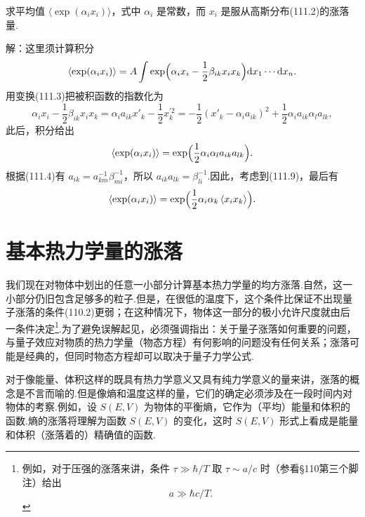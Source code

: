 \begin{xiti}

求平均值 $\langle\exp(\alpha_{i}x_{i})\rangle$，式中 $\alpha_{i}$ 是常数，而 $x_{i}$
是服从高斯分布(111.2)的涨落量.

解：这里须计算积分
\begin{equation*}
  \left\langle\exp(\alpha_{i}x_{i})\right\rangle=A\int
  \exp\Bigl(\alpha_{i}x_{i}-\frac{1}{2}\beta_{ik}x_{i}x_{k}\Bigr)
  \mathrm{d}x_{1}\cdots\mathrm{d}x_{n}.
\end{equation*}
用变换(111.3)把被积函数的指数化为
\begin{equation*}
  \alpha_{i}x_{i}-\frac{1}{2}\beta_{ik}x_{i}x_{k}
  =\alpha_{i}a_{ik}x'_{k}-\frac{1}{2}x_{k}^{\prime 2}
  =-\frac{1}{2}(x'_{k}-\alpha_{i}a_{ik})^{2}
  +\frac{1}{2}\alpha_{i}a_{ik}\alpha_{l}a_{lk},
\end{equation*}
此后，积分给出
\begin{equation*}
  \left\langle\exp(\alpha_{i}x_{i})\right\rangle
  =\exp\Bigl(\frac{1}{2}\alpha_{i}\alpha_{l}a_{ik}a_{lk}\Bigr).
\end{equation*}
根据(111.4)有 $a_{ik}=a^{-1}_{km}\beta^{-1}_{mi}$，所以
$a_{ik}a_{lk}=\beta^{-1}_{li}$.因此，考虑到(111.9)，最后有
\begin{equation*}
  \left\langle\exp(\alpha_{i}x_{i})\right\rangle
  =\exp\Bigl(\frac{1}{2}\alpha_{i}\alpha_{k}
  \left\langle x_{i}x_{k}\right\rangle\Bigr).
\end{equation*}

\end{xiti}

\section{基本热力学量的涨落}

我们现在对物体中划出的任意一小部分计算基本热力学量的均方涨落.自然，这一小部分仍旧包含足够多的粒子.但是，在很低的温度下，这个条件比保证不出现量子涨落的条件(110.2)更弱；在这种情况下，物体这一部分的极小允许尺度就由后一条件决定\footnote{例如，对于压强的涨落来讲，条件 $\tau\gg\hbar/T$ 取 $\tau\sim a/c$ 时（参看§110第三个脚注）给出
\begin{equation*}
  a\gg\hbar c/T.
\end{equation*}}.为了避免误解起见，必须强调指出：关于量子涨落如何重要的问题，与量子效应对物质的热力学量（物态方程）有何影响的问题没有任何关系；涨落可能是经典的，但同时物态方程却可以取决于量子力学公式.

对于像能量、体积这样的既具有热力学意义又具有纯力学意义的量来讲，涨落的概念是不言而喻的.但是像熵和温度这样的量，它们的确定必须涉及在一段时间内对物体的考察.例如，设 $S(E,V)$ 为物体的平衡熵，它作为（平均）能量和体积的函数.熵的涨落将理解为函数 $S(E,V)$ 的变化，这时 $S(E,V)$ 形式上看成是能量和体积（涨落着的）精确值的函数.

